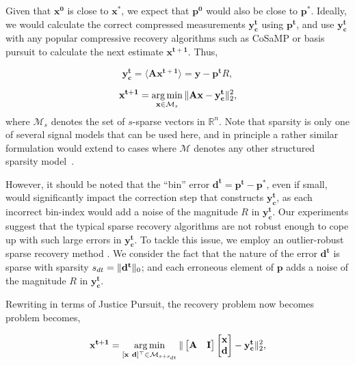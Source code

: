 Given that $\mathbf{x^0}$ is close to $\mathbf{x^*}$, we expect that $\mathbf{p^0}$ would also be close to $\mathbf{p^*}$. Ideally, we would calculate the correct compressed measurements $\mathbf{y^t_c}$ using $\mathbf{p^t}$, and use $\mathbf{y^t_c}$ with any popular compressive recovery algorithms such as CoSaMP or basis pursuit to calculate the next estimate $\mathbf{{x}^{t+1}}$. Thus,

$$
\mathbf{y^t_c} = \langle \mathbf{A}\mathbf{x^{t+1}} \rangle = \mathbf{y} - \mathbf{p^t}R,
$$

$$
\mathbf{{x}^{t+1}} = \argmin_{\mathbf{x} \in \mathcal{M}_s}\norm{\mathbf{Ax} - \mathbf{y^t_c}}_2^2, %
$$
where $\mathcal{M}_s$ denotes the set of $s$-sparse vectors in $\mathbb{R}^n$. Note that sparsity is only one of several signal models that can be used here, and in principle a rather similar formulation would extend to cases where $\mathcal{M}$ denotes any other structured sparsity model~\cite{modelcs}.

However, it should be noted that the ``bin'' error $\mathbf{d^t} = \mathbf{p^t - p^*}$, even if small, would significantly impact the correction step that constructs $\mathbf{y^t_c}$, as each incorrect bin-index would add a noise of the magnitude $R$ in $\mathbf{y^t_c}$. Our experiments suggest that the typical sparse recovery algorithms are not robust enough to cope up with such large errors in $\mathbf{y^t_c}$. To tackle this issue, we employ an outlier-robust sparse recovery method \cite{Laska2009}. We consider the fact that the nature of the error $\mathbf{d^t}$ is sparse with sparsity $s_{dt}=\|\mathbf{d^t}\|_0$; and each erroneous element of $\mathbf{p}$ adds a noise of the magnitude $R$ in $\mathbf{y^t_c}$.

Rewriting in terms of Justice Pursuit, the recovery problem now becomes problem becomes,

$$
\mathbf{{x}^{t+1}}=\argmin_{[\mathbf{x~d}]^\t \in \mathcal{M}_{s+s_{dt}}}\norm{\begin{bmatrix} \mathbf{A} & \mathbf{I} \end{bmatrix} \begin{bmatrix} \mathbf{x} \\ \mathbf{d} \end{bmatrix} - \mathbf{y^t_c}}_2^2, %
$$


